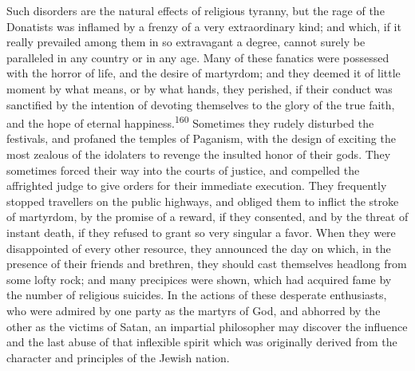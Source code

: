 
Such disorders are the natural effects of religious tyranny, but
the rage of the Donatists was inflamed by a frenzy of a very
extraordinary kind; and which, if it really prevailed among them
in so extravagant a degree, cannot surely be paralleled in any
country or in any age. Many of these fanatics were possessed with
the horror of life, and the desire of martyrdom; and they deemed
it of little moment by what means, or by what hands, they
perished, if their conduct was sanctified by the intention of
devoting themselves to the glory of the true faith, and the hope
of eternal happiness.\textsuperscript{160} Sometimes they rudely disturbed the
festivals, and profaned the temples of Paganism, with the design
of exciting the most zealous of the idolaters to revenge the
insulted honor of their gods. They sometimes forced their way
into the courts of justice, and compelled the affrighted judge to
give orders for their immediate execution. They frequently
stopped travellers on the public highways, and obliged them to
inflict the stroke of martyrdom, by the promise of a reward, if
they consented, and by the threat of instant death, if they
refused to grant so very singular a favor. When they were
disappointed of every other resource, they announced the day on
which, in the presence of their friends and brethren, they should
cast themselves headlong from some lofty rock; and many
precipices were shown, which had acquired fame by the number of
religious suicides. In the actions of these desperate
enthusiasts, who were admired by one party as the martyrs of God,
and abhorred by the other as the victims of Satan, an impartial
philosopher may discover the influence and the last abuse of that
inflexible spirit which was originally derived from the character
and principles of the Jewish nation.


